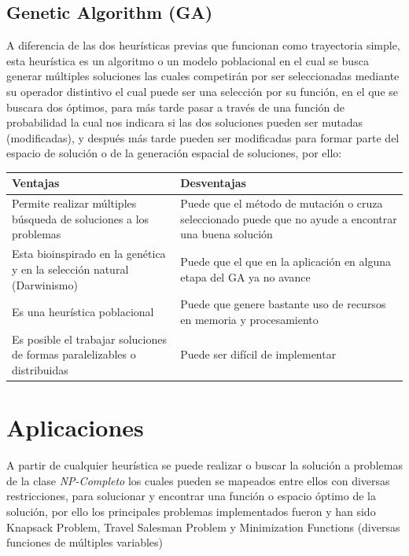 \documentclass[10pt]{article}
\begin{document}
\subsection{Genetic Algorithm (GA)}
A diferencia de las dos heurísticas previas que funcionan como trayectoria simple, esta heurística es un algoritmo o un modelo poblacional en el cual se busca generar múltiples soluciones las cuales competirán por ser seleccionadas mediante su operador distintivo el cual puede ser una selección por su función, en el que se buscara dos óptimos, para más tarde pasar a través de una función de probabilidad la cual nos indicara si las dos soluciones pueden ser mutadas (modificadas), y después más tarde pueden ser modificadas para formar parte del espacio de solución o de la generación espacial de soluciones, por ello:
\begin{center}
  \begin{tabular}{|p{6cm}|p{6cm}|}
    \hline
    Ventajas & Desventajas \\
    \hline
    Permite realizar múltiples búsqueda de soluciones a los problemas & Puede que el método de mutación o cruza seleccionado puede que no ayude a encontrar una buena solución\\
    \hline
    Esta bioinspirado en la genética y en la selección natural (Darwinismo) & Puede que el que en la aplicación en alguna etapa del GA ya no avance \\
    \hline
    Es una heurística poblacional & Puede que genere bastante uso de recursos en memoria y procesamiento \\
    \hline
    Es posible el trabajar soluciones de formas paralelizables o distribuidas&Puede ser difícil de implementar\\
    \hline
  \end{tabular}
\end{center}
\section{Aplicaciones}
A partir de cualquier heurística se puede realizar o buscar la solución a problemas de la clase \textit{NP-Completo} los cuales pueden se mapeados entre ellos con diversas restricciones, para solucionar y encontrar una función o espacio óptimo de la solución, por ello los principales problemas implementados fueron y han sido Knapsack Problem, Travel Salesman Problem y Minimization Functions (diversas funciones de múltiples variables)
\end{document}
